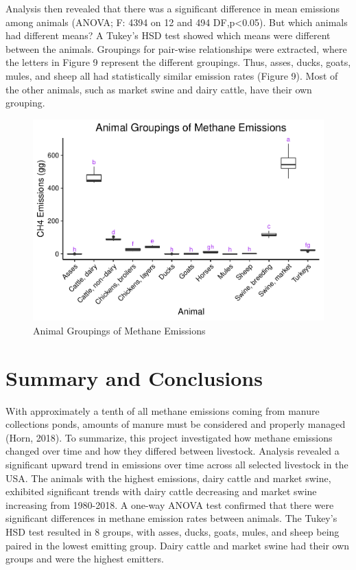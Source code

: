 \documentclass[
  12pt,
]{article}
\begin{document}
Analysis then revealed that there was a significant difference in mean
emissions among animals (ANOVA; F: 4394 on 12 and 494
DF,p\textless0.05). But which animals had different means? A Tukey's HSD
test showed which means were different between the animals. Groupings
for pair-wise relationships were extracted, where the letters in Figure
9 represent the different groupings. Thus, asses, ducks, goats, mules,
and sheep all had statistically similar emission rates (Figure 9). Most
of the other animals, such as market swine and dairy cattle, have their
own grouping.

\begin{figure}
\centering
\includegraphics{SultzerSwit_ENV872_Project_files/figure-latex/anova results-1.pdf}
\caption{Animal Groupings of Methane Emissions}
\end{figure}

\newpage

\hypertarget{summary-and-conclusions}{%
\section{Summary and Conclusions}\label{summary-and-conclusions}}

With approximately a tenth of all methane emissions coming from manure
collections ponds, amounts of manure must be considered and properly
managed (Horn, 2018). To summarize, this project investigated how
methane emissions changed over time and how they differed between
livestock. Analysis revealed a significant upward trend in emissions
over time across all selected livestock in the USA. The animals with the
highest emissions, dairy cattle and market swine, exhibited significant
trends with dairy cattle decreasing and market swine increasing from
1980-2018. A one-way ANOVA test confirmed that there were significant
differences in methane emission rates between animals. The Tukey's HSD
test resulted in 8 groups, with asses, ducks, goats, mules, and sheep
being paired in the lowest emitting group. Dairy cattle and market swine
had their own groups and were the highest emitters.
\end{document}
